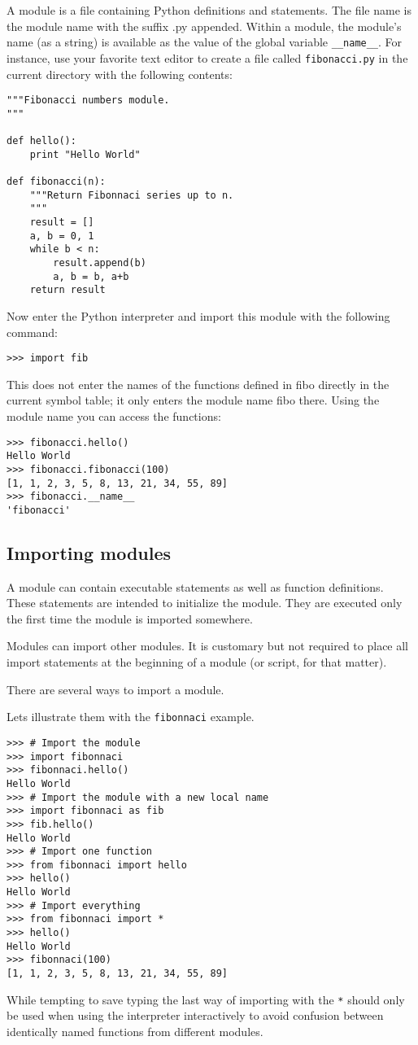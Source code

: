 \documentclass[10pt,a4paper]{article}
\begin{document}
A module is a file containing Python definitions and statements. The file name is the module name with the suffix .py appended. Within a module, the module's name (as a string) is available as the value of the global variable \verb|__name__|. For instance, use your favorite text editor to create a file called \verb|fibonacci.py| in the current directory with the following contents:
\begin{lstlisting}
"""Fibonacci numbers module.
"""

def hello():
    print "Hello World"

def fibonacci(n):
    """Return Fibonnaci series up to n.
    """
    result = []
    a, b = 0, 1
    while b < n:
        result.append(b)
        a, b = b, a+b
    return result
\end{lstlisting}
Now enter the Python interpreter and import this module with the following command:
\begin{lstlisting}
>>> import fib
\end{lstlisting}
This does not enter the names of the functions defined in fibo directly in the current symbol table; it only enters the module name fibo there. Using the module name you can access the functions:
\begin{lstlisting}
>>> fibonacci.hello()
Hello World
>>> fibonacci.fibonacci(100)
[1, 1, 2, 3, 5, 8, 13, 21, 34, 55, 89]
>>> fibonacci.__name__
'fibonacci'
\end{lstlisting}
\subsection{Importing modules}
A module can contain executable statements as well as function definitions. These statements are intended to initialize the module. They are executed only the first time the module is imported somewhere.

Modules can import other modules. It is customary but not required to place all import statements at the beginning of a module (or script, for that matter).

There are several ways to import a module.

Lets illustrate them with the \verb|fibonnaci| example.
\begin{lstlisting}
>>> # Import the module
>>> import fibonnaci
>>> fibonnaci.hello()
Hello World
>>> # Import the module with a new local name
>>> import fibonnaci as fib
>>> fib.hello()
Hello World
>>> # Import one function
>>> from fibonnaci import hello
>>> hello()
Hello World
>>> # Import everything
>>> from fibonnaci import *
>>> hello()
Hello World
>>> fibonnaci(100)
[1, 1, 2, 3, 5, 8, 13, 21, 34, 55, 89]
\end{lstlisting}
While tempting to save typing the last way of importing with the \verb|*| should only be used when using the interpreter interactively to avoid confusion between identically named functions from different modules.
\end{document}
